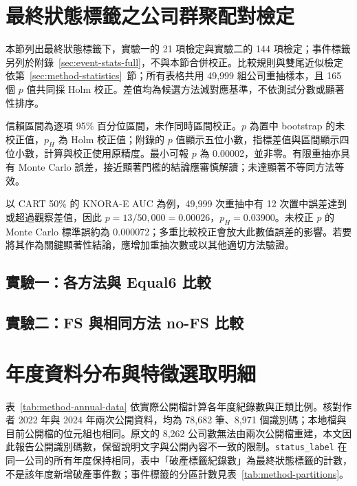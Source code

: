 \clearpage
\section{最終狀態標籤之公司群聚配對檢定}\label{sec:stats-full}

本節列出最終狀態標籤下，實驗一的 21 項檢定與實驗二的 144 項檢定；事件標籤另列於附錄~\ref{sec:event-stats-full}，不與本節合併校正。比較規則與雙尾近似檢定依第~\ref{sec:method-statistics}~節；所有表格共用 49,999 組公司重抽樣本，且 165 個 \(p\) 值共同採 Holm 校正。差值均為候選方法減對應基準，不依測試分數或顯著性排序。

信賴區間為逐項 95\% 百分位區間，未作同時區間校正。\(p\) 為置中 bootstrap 的未校正值，\(p_H\) 為 Holm 校正值；附錄的 \(p\) 值顯示五位小數，指標差值與區間顯示四位小數，計算與校正使用原精度。最小可報 \(p\) 為 0.00002，並非零。有限重抽亦具有 Monte Carlo 誤差，接近顯著門檻的結論應審慎解讀；未達顯著不等同方法等效。

以 CART 50\% 的 KNORA-E AUC 為例，49,999 次重抽中有 12 次置中誤差達到或超過觀察差值，因此 \(p=13/50{,}000=0.00026\)，\(p_H=0.03900\)。未校正 \(p\) 的 Monte Carlo 標準誤約為 0.000072；多重比較校正會放大此數值誤差的影響。若要將其作為關鍵顯著性結論，應增加重抽次數或以其他適切方法驗證。

\subsection*{實驗一：各方法與 Equal6 比較}


\subsection*{實驗二：FS 與相同方法 no-FS 比較}




\clearpage
\section{年度資料分布與特徵選取明細}\label{sec:appendix-data-fs}

表~\ref{tab:method-annual-data} 依實際公開檔計算各年度紀錄數與正類比例。核對作者 2022 年與 2024 年兩次公開資料，均為 78,682 筆、8,971 個識別碼；本地檔與目前公開檔的位元組也相同。原文的 8,262 公司數無法由兩次公開檔重建，本文因此報告公開識別碼數，保留說明文字與公開內容不一致的限制。\nolinkurl{status_label} 在同一公司的所有年度保持相同，表中「破產標籤紀錄數」為最終狀態標籤的計數，不是該年度新增破產事件數；事件標籤的分區計數見表~\ref{tab:method-partitions}。

